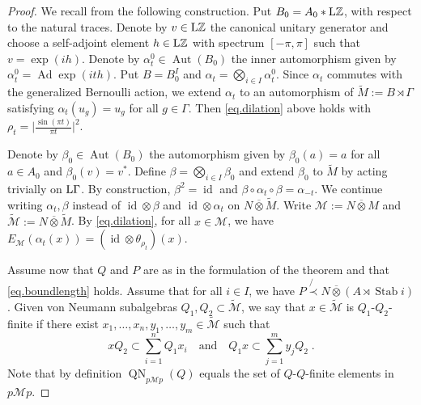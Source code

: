 \documentclass[a4paper,11pt]{amsart}
\numberwithin{equation}{section}
\begin{document}
\begin{proof}
We recall from \cite[Section 2]{Io06} the following construction. Put $B_0 = A_0 * {\mathord{\text{\rm L}}} {\mathbb{Z}}$, with respect to the natural traces. Denote by $v \in {\mathord{\text{\rm L}}} {\mathbb{Z}}$ the canonical unitary generator and choose a self-adjoint element $h \in {\mathord{\text{\rm L}}} {\mathbb{Z}}$ with spectrum $[-\pi,\pi]$ such that $v = \exp(ih)$. Denote by ${\alpha}^0_t \in {\operatorname{Aut}}(B_0)$ the inner automorphism given by ${\alpha}^0_t = {\operatorname{Ad}} \exp(ith)$. Put $B = B_0^I$ and ${\alpha}_t = \bigotimes_{i \in I} {\alpha}^0_t$. Since ${\alpha}_t$ commutes with the generalized Bernoulli action, we extend ${\alpha}_t$ to an automorphism of ${\widetilde{M}} := B \rtimes \Gamma$ satisfying ${\alpha}_t(u_g) = u_g$ for all $g \in \Gamma$. Then \eqref{eq.dilation} above holds with $\rho_t = \bigl| \frac{\sin(\pi t)}{\pi t}\bigr|^2$.

Denote by $\beta_0 \in {\operatorname{Aut}}(B_0)$ the automorphism given by $\beta_0(a) = a$ for all $a \in A_0$ and $\beta_0(v) = v^*$. Define $\beta = \bigotimes_{i \in I} \beta_0$ and extend $\beta_0$ to ${\widetilde{M}}$ by acting trivially on ${\mathord{\text{\rm L}}} \Gamma$. By construction, $\beta^2 = {\mathord{\operatorname{id}}}$ and $\beta \circ {\alpha}_t \circ \beta = {\alpha}_{-t}$. We continue writing ${\alpha}_t,{\beta}$ instead of ${\mathord{\operatorname{id}}} {\otimes} {\beta}$ and ${\mathord{\operatorname{id}}} {\otimes} {\alpha}_t$ on $N {\mathbin{\overline{\otimes}}} {\widetilde{M}}$. Write ${\mathcal{M}} := N {\mathbin{\overline{\otimes}}} M$ and ${\widetilde{\mathcal{M}}} := N {\mathbin{\overline{\otimes}}} {\widetilde{M}}$. By \eqref{eq.dilation}, for all $x \in {\mathcal{M}}$, we have $E_{\mathcal{M}}({\alpha}_t(x)) = ({\mathord{\operatorname{id}}} {\otimes} \theta_{\rho_t})(x)$.

Assume now that $Q$ and $P$ are as in the formulation of the theorem and that \eqref{eq.boundlength} holds. Assume that for all $i \in I$, we have $P \not{\prec} N {\mathbin{\overline{\otimes}}} (A \rtimes {\operatorname{Stab}} i)$. Given von Neumann subalgebras $Q_1,Q_2 \subset {\widetilde{\mathcal{M}}}$, we say that $x \in {\widetilde{\mathcal{M}}}$ is $Q_1$-$Q_2$-finite if there exist $x_1,\ldots,x_n,y_1,\ldots,y_m \in {\widetilde{\mathcal{M}}}$ such that
$$x Q_2 \subset \sum_{i=1}^n Q_1 x_i \quad\text{and}\quad Q_1 x \subset \sum_{j=1}^m y_j Q_2 \; .$$
Note that by definition ${\operatorname{QN}}_{p{\mathcal{M}} p}(Q)$ equals the set of $Q$-$Q$-finite elements in $p{\mathcal{M}} p$.


\end{proof}
\end{document}
